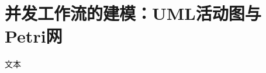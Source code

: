 \documentclass[index]{subfiles}
\begin{document}
\chapter{并发工作流的建模：UML活动图与Petri网}
文本
\end{document}
